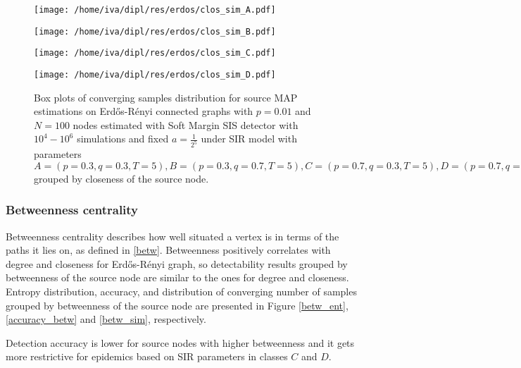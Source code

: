 \documentclass[times, utf8, diplomski]{fer}
\begin{document}
\begin{figure}[H]
\begin{minipage}{0.5\textwidth}
\texttt{[image: /home/iva/dipl/res/erdos/clos\_sim\_A.pdf]}
\end{minipage}
\begin{minipage}{0.5\textwidth}
\texttt{[image: /home/iva/dipl/res/erdos/clos\_sim\_B.pdf]}
\end{minipage}
\begin{minipage}{0.5\textwidth}
\texttt{[image: /home/iva/dipl/res/erdos/clos\_sim\_C.pdf]}
\end{minipage}
\begin{minipage}{0.5\textwidth}
\texttt{[image: /home/iva/dipl/res/erdos/clos\_sim\_D.pdf]}
\end{minipage}
\caption{Box plots of converging samples distribution for source MAP estimations on  Erd{\H{o}}s-R{\'{e}}nyi connected graphs with $p=0.01$ and $N=100$ nodes estimated with Soft Margin SIS detector with $10^4 - 10^6$ simulations and fixed $a = \frac{1}{2^5}$ under SIR model with parameters $A = (p=0.3, q=0.3, T=5), B = (p=0.3, q=0.7, T=5), C = (p=0.7, q=0.3, T=5), D = (p=0.7, q=0.7, T=5)$ grouped by closeness of the source node.}
\end{figure}

\subsubsection{Betweenness centrality}

Betweenness centrality describes how well situated a vertex is in terms of the paths it lies on, as defined in \ref{betw}. Betweenness positively correlates with degree and closeness  for Erd{\H{o}}s-R{\'{e}}nyi graph, so detectability  results grouped by betweenness of the source node are similar to the ones for degree and closeness. Entropy distribution, accuracy, and distribution of converging number of samples grouped by betweenness of the source node are presented in Figure \ref{betw_ent}, \ref{accuracy_betw} and \ref{betw_sim}, respectively.

Detection accuracy is lower for source nodes with higher betweenness and it gets more restrictive for epidemics based on SIR parameters in classes $C$ and $D$.
\end{document}
